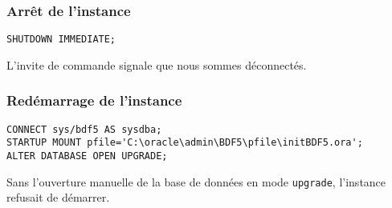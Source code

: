 \documentclass[a4paper, oneside, 12pt]{article}
\begin{document}
\subsubsection{Arrêt de l’instance}

\begin{verbatim}
SHUTDOWN IMMEDIATE;
\end{verbatim}

L’invite de commande signale que nous sommes déconnectés.

\subsubsection{Redémarrage de l’instance}

\begin{verbatim}
CONNECT sys/bdf5 AS sysdba;
STARTUP MOUNT pfile='C:\oracle\admin\BDF5\pfile\initBDF5.ora';
ALTER DATABASE OPEN UPGRADE;
\end{verbatim}

Sans l’ouverture manuelle de la base de données en mode
\texttt{upgrade}, l’instance refusait de démarrer.
\end{document}
